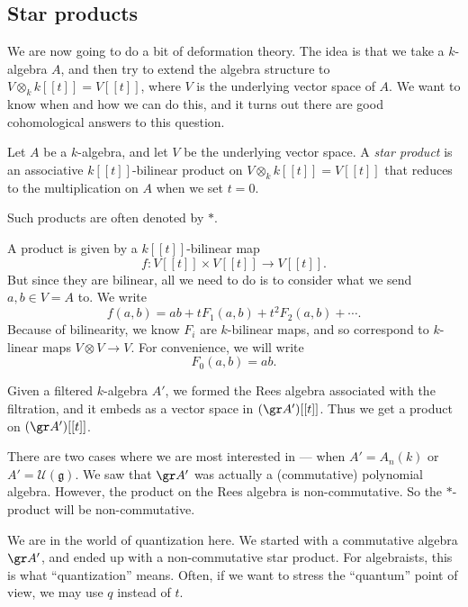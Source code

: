 \documentclass[a4paper]{article}
\begin{document}
\subsection{Star products}
We are now going to do a bit of deformation theory. The idea is that we take a $k$-algebra $A$, and then try to extend the algebra structure to $V\otimes_k k[[t]] = V[[t]]$, where $V$ is the underlying vector space of $A$. We want to know when and how we can do this, and it turns out there are good cohomological answers to this question.

\begin{defi}
  Let $A$ be a $k$-algebra, and let $V$ be the underlying vector space. A \emph{star product} is an associative $k[[t]]$-bilinear product on $V \otimes_k k[[t]] = V[[t]]$ that reduces to the multiplication on $A$ when we set $t = 0$.
\end{defi}
Such products are often denoted by $*$.

A product is given by a $k[[t]]$-bilinear map
\[
  f: V[[t]] \times V[[t]] \to V[[t]].
\]
But since they are bilinear, all we need to do is to consider what we send $a, b \in V = A$ to. We write
\[
  f(a, b) = ab + t F_1(a, b) + t^2 F_2(a, b) + \cdots.
\]
Because of bilinearity, we know $F_i$ are $k$-bilinear maps, and so correspond to $k$-linear maps $V \otimes V \to V$. For convenience, we will write
\[
  F_0(a, b) = ab.
\]
\begin{eg} %
  Given a filtered $k$-algebra $A'$, we formed the Rees algebra associated with the filtration, and it embeds as a vector space in $(\gr A')[[t]]$. Thus we get a product on $(\gr A')[[t]]$.

  There are two cases where we are most interested in --- when $A' = A_n(k)$ or $A' = \mathcal{U}(\mathfrak{g})$. We saw that $\gr A'$ was actually a (commutative) polynomial algebra. However, the product on the Rees algebra is non-commutative. So the $*$-product will be non-commutative.
\end{eg}

We are in the world of quantization here. We started with a commutative algebra $\gr A'$, and ended up with a non-commutative star product. For algebraists, this is what ``quantization'' means. Often, if we want to stress the ``quantum'' point of view, we may use $q$ instead of $t$.
\end{document}
